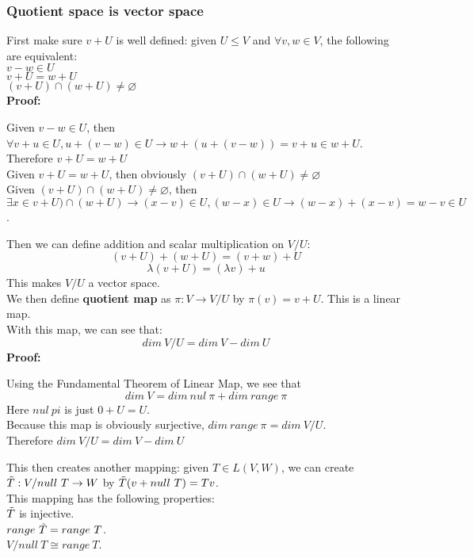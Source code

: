 \documentclass{article}
\begin{document}
\subsubsection{Quotient space is vector space}
First make sure $v+U$ is well defined: given $U \leq V$ and $\forall v, w \in V$, the following are equivalent:\\
$v-w \in U$\\
$v + U = w + U$\\
$(v+U) \cap (w+U) \neq \varnothing$\\
\textbf{Proof:}
\begin{addmargin}[1em]{0em}
Given $v - w \in U$, then $\forall v + u \in U, u + (v-w) \in U \rightarrow w + (u + (v-w)) = v + u \in w + U$. Therefore $v + U = w + U$\\
Given $v + U = w + U$, then obviously $(v+U) \cap (w+U) \neq \varnothing$\\
Given $(v+U) \cap (w+U) \neq \varnothing$, then $\exists x \in v+U) \cap (w+U) \rightarrow (x - v) \in U, (w - x) \in U \rightarrow (w - x) + (x - v) = w - v \in U$.
\end{addmargin}
Then we can define addition and scalar multiplication on $V/U$:
\begin{equation*}
    (v+U) + (w+U) = (v+w) + U
\end{equation*}
\begin{equation*}
    \lambda (v+U) = (\lambda v) + u
\end{equation*}
This makes $V/U$ a vector space.\\
We then define \textbf{quotient map} as $\pi: V \rightarrow V/U$ by $\pi(v) = v + U$. This is a linear map.\\
With this map, we can see that:
\begin{equation*}
    dim\ V/U = dim\ V - dim\ U
\end{equation*}
\textbf{Proof:}
\begin{addmargin}[1em]{0em}
Using the Fundamental Theorem of Linear Map, we see that
\begin{equation*}
    dim\ V = dim\ nul\ \pi + dim\ range\ \pi
\end{equation*}
Here $nul\ pi$ is just $0 + U = U$.\\
Because this map is obviously surjective, $dim\ range\ \pi = dim\ V/U$.\\
Therefore $dim\ V/U = dim\ V - dim\ U$
\end{addmargin}
This then creates another mapping: given $T \in L(V, W)$, we can create $\Tilde{T}:V/null\ T \rightarrow W$ by $\Tilde{T}(v + null\ T) = Tv$.\\
This mapping has the following properties:\\
$\Tilde{T}$ is injective.\\
$range\ \Tilde{T} = range\ T$.\\
$V/null\ T \cong range\ T$.
\end{document}
